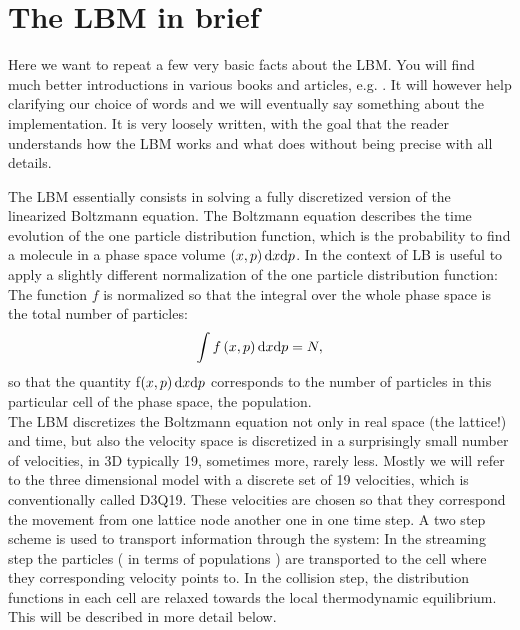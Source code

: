 \chapter{The LBM in brief}
Here we want to repeat a few very basic facts about the LBM. 
You will find much better introductions in various books and
articles, e.g. \cite{succi, duenweg}. It will however help clarifying 
our choice of words and we will eventually say something about the 
implementation. It is very loosely written, with the goal that
the reader understands how the LBM works and what \ES{} does without
being precise with all details. 

The LBM essentially consists in solving a fully discretized
version of the linearized Boltzmann equation. The Boltzmann equation
describes the time evolution of the one particle distribution
function, which is the probability to find a molecule in a phase
space volume $\left(x,p\right)\mathrm d x \mathrm d p$. In the context of
LB is useful to apply a slightly different normalization of
the one particle distribution function: The function $f$ is normalized
so that the integral over the whole phase space is the total 
number of particles:
\begin{equation*}
  \int f\left(x,p\right)\mathrm d x \mathrm d p = N,
\end{equation*}
so that the quantity f$\left(x,p\right)\mathrm d x \mathrm d p$ corresponds
to the number of particles in this particular cell of the phase
space, the population. \\

The LBM discretizes the Boltzmann equation not only in real
space (the lattice!) and time, but also the velocity space is discretized 
in a surprisingly small number of velocities, in 3D typically
19, sometimes more, rarely less. 
Mostly we will refer to the three dimensional model with a discrete
set of 19 velocities, which is conventionally called D3Q19.
These velocities
are chosen so that they correspond the movement from one lattice
node another one in one time step. A two step scheme is used to transport
information through the system: In the streaming step
the particles ( in terms of populations ) are transported
to the cell where they corresponding velocity points to. 
In the collision step, the distribution functions
in each cell are relaxed towards the local thermodynamic
equilibrium. This will be described in more detail below.

